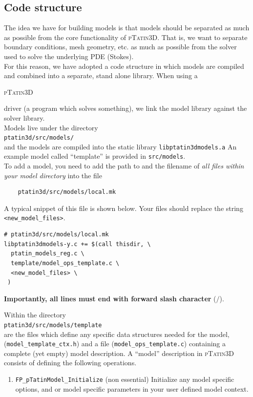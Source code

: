 \documentclass[paper=a4, fontsize=10pt,twoside]{scrartcl}
\newcommand{\ptat}{{{\textsc{pTatin3D}}}}
\newcommand{\shellcmd}[1]{\\\indent\indent\texttt{\hspace{5mm}\footnotesize #1}\\}
\newcommand{\unix}[1]{\texttt{\footnotesize #1}}
\begin{document}
\subsection{Code structure}
The idea we have for building models is that models should be separated as much as possible
from the core functionality of {\ptat}. That is, we want to separate boundary conditions,
mesh geometry, etc. as much as possible from the solver used to solve the underlying PDE (Stokes).
\\[8pt]
For this reason, we have adopted a code structure in which models are compiled and combined into
a separate, stand alone library. When using a {\ptat{ driver (a program which solves something),
we link the model library against the solver library.
\\[8pt]
Models live under the directory
	\shellcmd{ptatin3d/src/models/}
and the models are compiled into the static library \unix{libptatin3dmodels.a}
An example model called ``template'' is provided in \unix{src/models}.
\\[8pt]
To add a model, you need to add the path to and the filename of \textit{all files within your model directory} into the file
\begin{lstlisting}
	ptatin3d/src/models/local.mk
\end{lstlisting}
A typical snippet of this file is shown below.
Your files should replace the string \texttt{<new\_model\_files>}.
\begin{lstlisting}
# ptatin3d/src/models/local.mk
libptatin3dmodels-y.c += $(call thisdir, \
  ptatin_models_reg.c \
  template/model_ops_template.c \
  <new_model_files> \
 )
\end{lstlisting}
\textbf{Importantly, all lines must end with forward slash character} ($\slash$).

Within the directory
	\shellcmd{ptatin3d/src/models/template}
are the files which define any specific data structures needed for the model,
	(\unix{model\_template\_ctx.h})
and a file (\unix{model\_ops\_template.c}) containing a complete (yet empty) model description.
A ``model'' description in {\ptat} consists of defining the following operations.
\begin{enumerate}
	\item \unix{FP\_pTatinModel\_Initialize} (non essential)
	Initialize any model specific options, and or model specific parameters in your user defined model context.


\end{enumerate}}}
\end{document}
